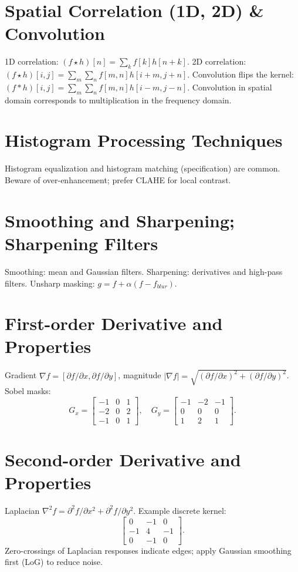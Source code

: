 \documentclass[12pt,a4paper]{article}
\begin{document}
\section{Spatial Correlation (1D, 2D) \& Convolution}
1D correlation: $(f\star h)[n]=\sum_k f[k] h[n+k]$. 2D correlation: $(f\star h)[i,j]=\sum_m\sum_n f[m,n] h[i+m,j+n]$. Convolution flips the kernel: $(f*h)[i,j]=\sum_m\sum_n f[m,n] h[i-m,j-n]$. Convolution in spatial domain corresponds to multiplication in the frequency domain.

\section{Histogram Processing Techniques}
Histogram equalization and histogram matching (specification) are common. Beware of over-enhancement; prefer CLAHE for local contrast.

\section{Smoothing and Sharpening; Sharpening Filters}
Smoothing: mean and Gaussian filters. Sharpening: derivatives and high-pass filters. Unsharp masking: $g=f+\alpha(f-f_{blur})$.

\section{First-order Derivative and Properties}
Gradient $\nabla f=[\partial f/\partial x, \partial f/\partial y]$, magnitude $|\nabla f|=\sqrt{(\partial f/\partial x)^2+(\partial f/\partial y)^2}$. Sobel masks:
\[ G_x=\begin{bmatrix}-1&0&1\\-2&0&2\\-1&0&1\end{bmatrix},\quad G_y=\begin{bmatrix}-1&-2&-1\\0&0&0\\1&2&1\end{bmatrix}.\]

\section{Second-order Derivative and Properties}
Laplacian $\nabla^2 f=\partial^2 f/\partial x^2 + \partial^2 f/\partial y^2$. Example discrete kernel:
\[ \begin{bmatrix}0 & -1 & 0\\ -1 & 4 & -1\\ 0 & -1 & 0\end{bmatrix}. \]
Zero-crossings of Laplacian responses indicate edges; apply Gaussian smoothing first (LoG) to reduce noise.
\end{document}
